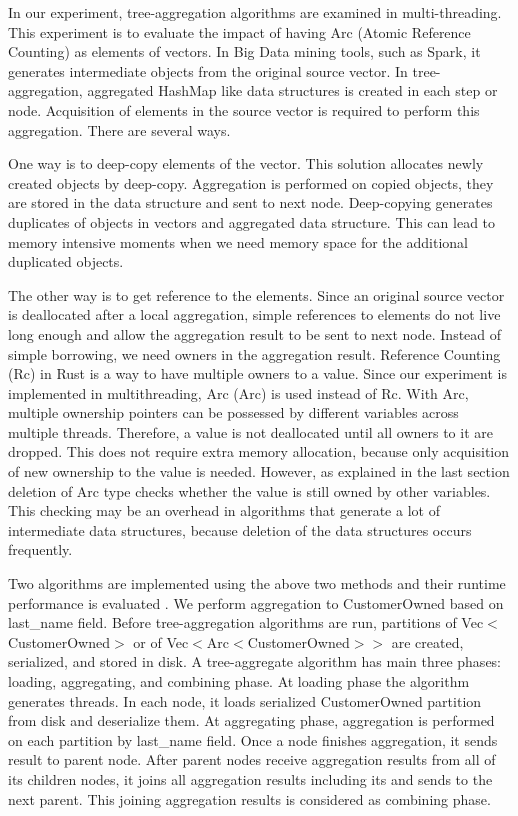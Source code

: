 In our experiment, tree-aggregation algorithms are examined in multi-threading. This experiment is to evaluate the impact of having Arc (Atomic Reference Counting) as elements of vectors. 
In Big Data mining tools, such as Spark, it generates intermediate objects from the original source vector. In tree-aggregation, aggregated HashMap like data structures is created in each step or node. 
Acquisition of elements in the source vector is required to perform this aggregation. There are several ways.

One way is to deep-copy elements of the vector. This solution allocates newly created objects by deep-copy. 
Aggregation is performed on copied objects, they are stored in the data structure and sent to next node. 
Deep-copying generates duplicates of objects in vectors and aggregated data structure. 
This can lead to memory intensive moments when we need memory space for the additional duplicated objects.

The other way is to get reference to the elements. Since an original source vector is deallocated after a local aggregation,
simple references to elements do not live long enough and allow the aggregation result to be sent to next node. 
Instead of simple borrowing, we need owners in the aggregation result. Reference Counting (Rc) in Rust is a way to have multiple owners to a value. 
Since our experiment is implemented in multithreading, Arc (Arc) is used instead of Rc. With Arc, multiple ownership pointers can be 
possessed by different variables across multiple threads. Therefore, a value is not deallocated until all owners to it are dropped. 
This does not require extra memory allocation, because only acquisition of new ownership to the value is needed. 
However, as explained in the last section deletion of Arc type checks whether the value is still owned by other variables. 
This checking may be an overhead in algorithms that generate a lot of intermediate data structures, because deletion of the data structures occurs frequently.

Two algorithms are implemented using the above two methods and their runtime performance is evaluated . 
We perform aggregation to CustomerOwned based on last\_name field. 
Before tree-aggregation algorithms are run, partitions of Vec$<$CustomerOwned$>$ or of Vec$<$Arc$<$CustomerOwned$>>$ are created, serialized, and stored in disk.
A tree-aggregate algorithm has main three phases: loading, aggregating, and combining phase. 
At loading phase the algorithm generates threads. In each node, it loads serialized CustomerOwned partition from disk and deserialize them.
At aggregating phase, aggregation is performed on each partition by last\_name field. Once a node finishes aggregation, it sends result to parent node. 
After parent nodes receive aggregation results from all of its children nodes, it joins all aggregation results including its and sends to the next parent. 
This joining aggregation results is considered as combining phase. 

